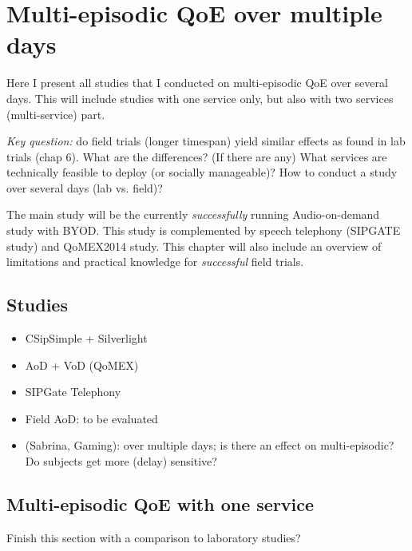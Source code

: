 \chapter{Multi-episodic QoE over multiple days}\label{chap:07}
\begin{chapter-abstract}
Here I present all studies that I conducted on multi-episodic QoE over several days.
This will include studies with one service only, but also with two services (multi-service) part.

\textit{Key question:} do field trials (longer timespan) yield similar effects as found in lab trials (chap 6).
What are the differences? (If there are any)
What services are technically feasible to deploy (or socially manageable)?
How to conduct a study over several days (lab vs. field)?

The main study will be the currently \textit{successfully} running Audio-on-demand study with BYOD.
This study is complemented by speech telephony (SIPGATE study) and QoMEX2014 study.
This chapter will also include an overview of limitations and practical knowledge for \textit{successful} field trials.
\end{chapter-abstract}

\section{Studies}
\begin{itemize}
\item CSipSimple + Silverlight
\item AoD + VoD (QoMEX)
\item SIPGate Telephony
\item Field AoD: to be evaluated
\item (Sabrina, Gaming): over multiple days; is there an effect on multi-episodic? Do subjects get more (delay) sensitive?
\end{itemize}

\section{Multi-episodic QoE with one service}


Finish this section with a comparison to laboratory studies?


